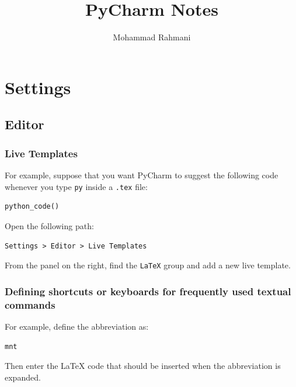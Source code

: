 \documentclass[a4paper]{article}
\title{PyCharm Notes}
\date{}
\author{Mohammad Rahmani}
\begin{document}
    
    \maketitle
    \tableofcontents
    
    
    \section{Settings}
        
        \subsection{Editor}
            
            \subsubsection{Live Templates}
                
                For example, suppose that you want PyCharm to suggest the following code
                whenever you type \texttt{py} inside a \texttt{.tex} file:
            
            \begin{verbatim}
python_code()
                \end{verbatim}
                
                Open the following path:
            
            \begin{center}
                \texttt{Settings > Editor > Live Templates}
                \end{center}
                
                From the panel on the right, find the \texttt{LaTeX} group and add a new live
                template.
                
                \subsubsection{Defining shortcuts or keyboards for frequently used textual commands}
                For example, define the abbreviation as:
            
            \begin{center}
                \texttt{mnt}
                \end{center}
                
                Then enter the LaTeX code that should be inserted when the abbreviation is
                expanded.
                
\end{document}
